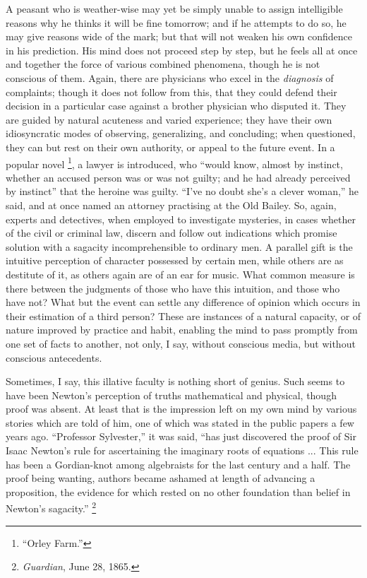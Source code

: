A peasant who is weather-wise may yet be simply unable to assign
intelligible reasons why he thinks it will be fine tomorrow; and if he
attempts to do so, he may give reasons wide of the mark; but that will
not weaken his own confidence in his prediction. His mind does not
proceed step by step, but he feels all at once and together the force
of various combined phenomena, though he is not conscious of them.
Again, there are physicians who excel in the \emph{diagnosis} of
complaints; though it does not follow from this, that they could
defend their decision in a particular case against a brother physician
who disputed it. They are guided by natural acuteness and varied
experience; they have their own idiosyncratic modes of observing,
generalizing, and concluding; when questioned, they can but rest on
their own authority, or appeal to the future event. In a popular novel
\footnote{``Orley Farm.''}, a lawyer is introduced,
who ``would know, almost by instinct, whether an accused person
was or was not guilty; and he had already perceived by instinct''
that the heroine was guilty. ``I've no doubt she's a clever
woman,'' he said, and at once named an attorney practising at the
Old Bailey. So, again, experts and detectives, when employed to
investigate mysteries, in cases whether of the civil or criminal law,
discern and follow out indications which promise solution with a
sagacity incomprehensible to ordinary men. A parallel gift is the
intuitive perception of character possessed by certain men, while
others are as destitute of it, as others again are of an ear for
music. What common measure is there between the judgments of
those who have this intuition, and those who have not? What but the
event can settle any difference of opinion which occurs in their
estimation of a third person? These are instances of a natural
capacity, or of nature improved by practice and habit, enabling the
mind to pass promptly from one set of facts to another, not only, I
say, without conscious media, but without conscious antecedents.

Sometimes, I say, this illative faculty is nothing short of genius.
Such seems to have been Newton's perception of truths mathematical and
physical, though proof was absent. At least that is the impression
left on my own mind by various stories which are told of him, one of
which was stated in the public papers a few years ago. ``Professor
Sylvester,'' it was said, ``has just discovered the proof of
Sir Isaac Newton's rule for ascertaining the imaginary roots of
equations ... This rule has been a Gordian-knot among algebraists for
the last century and a half. The proof being wanting, authors became
ashamed at length of advancing a proposition, the evidence for which
rested on no other foundation than belief in Newton's sagacity.''
\footnote{\emph{Guardian},
June 28, 1865.}

